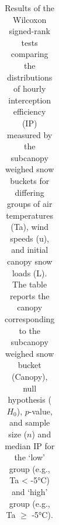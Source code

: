 \documentclass[
  letterpaper,
]{tex/uofsthesis-cs}
\begin{document}
\begin{longtable}[]{@{}
  >{\raggedright\arraybackslash}p{}
  >{\raggedright\arraybackslash}p{}
  >{\raggedright\arraybackslash}p{}
  >{\raggedright\arraybackslash}p{}
  >{\raggedright\arraybackslash}p{}
  >{\raggedright\arraybackslash}p{}@{}}

\caption{\label{tbl-scl-hrly-stats}Results of the Wilcoxon signed-rank
tests comparing the distributions of hourly interception efficiency (IP)
measured by the subcanopy weighed snow buckets for differing groups of
air temperatures (Ta), wind speeds (u), and initial canopy snow loads
(L). The table reports the canopy corresponding to the subcanopy weighed
snow bucket (Canopy), null hypothesis (\(H_0\)), \(p\)-value, and sample
size (\(n\)) and median IP for the `low' group (e.g., Ta \textless{}
-5°C) and `high' group (e.g., Ta \(\ge\) -5°C).}

\tabularnewline


\end{longtable}
\end{document}
